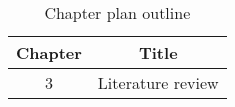 \begin{table}[h!]
\centering
\begin{tabular}{cc}
{Chapter} & {Title} \\ \midrule
{3} & {Literature review} \\

\end{tabular}
\caption{Chapter plan outline}
\label{table:1}
\end{table}